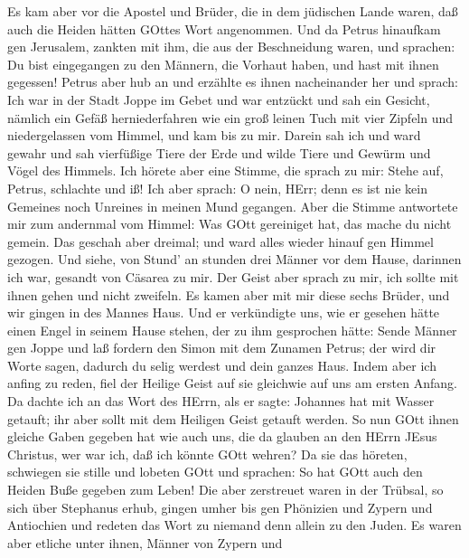  Es kam aber vor die Apostel und Brüder, die in dem
jüdischen Lande waren, daß auch die Heiden hätten GOttes Wort
angenommen.  Und da Petrus hinaufkam gen Jerusalem, zankten
mit ihm, die aus der Beschneidung waren,  und sprachen: Du
bist eingegangen zu den Männern, die Vorhaut haben, und hast mit ihnen
gegessen!  Petrus aber hub an und erzählte es ihnen
nacheinander her und sprach:  Ich war in der Stadt Joppe im
Gebet und war entzückt und sah ein Gesicht, nämlich ein Gefäß
herniederfahren wie ein groß leinen Tuch mit vier Zipfeln und
niedergelassen vom Himmel, und kam bis zu mir.  Darein sah
ich und ward gewahr und sah vierfüßige Tiere der Erde und wilde Tiere
und Gewürm und Vögel des Himmels.  Ich hörete aber eine
Stimme, die sprach zu mir: Stehe auf, Petrus, schlachte und iß!
 Ich aber sprach: O nein, HErr; denn es ist nie kein
Gemeines noch Unreines in meinen Mund gegangen.  Aber die
Stimme antwortete mir zum andernmal vom Himmel: Was GOtt gereiniget hat,
das mache du nicht gemein.  Das geschah aber dreimal; und
ward alles wieder hinauf gen Himmel gezogen.  Und siehe,
von Stund' an stunden drei Männer vor dem Hause, darinnen ich war,
gesandt von Cäsarea zu mir.  Der Geist aber sprach zu mir,
ich sollte mit ihnen gehen und nicht zweifeln. Es kamen aber mit mir
diese sechs Brüder, und wir gingen in des Mannes Haus.  Und
er verkündigte uns, wie er gesehen hätte einen Engel in seinem Hause
stehen, der zu ihm gesprochen hätte: Sende Männer gen Joppe und laß
fordern den Simon mit dem Zunamen Petrus;  der wird dir
Worte sagen, dadurch du selig werdest und dein ganzes Haus.
 Indem aber ich anfing zu reden, fiel der Heilige Geist auf
sie gleichwie auf uns am ersten Anfang.  Da dachte ich an
das Wort des HErrn, als er sagte: Johannes hat mit Wasser getauft; ihr
aber sollt mit dem Heiligen Geist getauft werden.  So nun
GOtt ihnen gleiche Gaben gegeben hat wie auch uns, die da glauben an den
HErrn JEsus Christus, wer war ich, daß ich könnte GOtt wehren?
 Da sie das höreten, schwiegen sie stille und lobeten GOtt
und sprachen: So hat GOtt auch den Heiden Buße gegeben zum Leben!
 Die aber zerstreuet waren in der Trübsal, so sich über
Stephanus erhub, gingen umher bis gen Phönizien und Zypern und
Antiochien und redeten das Wort zu niemand denn allein zu den Juden.
 Es waren aber etliche unter ihnen, Männer von Zypern und
